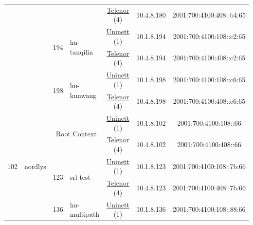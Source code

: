 \begin{small}
\begin{center}
\begin{longtable}{|c|c|c|c|c|c|c|c|}
  &  &  &  & \multicolumn{2}{|c|}{\tiny{\href{https://www.telenor.no}{Telenor} (4)}} & \tiny{10.4.8.180} & \tiny{2001:700:4100:408::b4:65} \\* \cline{3-3}\cline{4-4}\cline{5-5}\cline{6-6}\cline{7-7}\cline{8-8}
  &  & \multirow{2}{*}{\tiny{194}} & \multicolumn{1}{|l|}{\multirow{2}{*}{\tiny{hu-tanqilin}}} & \multicolumn{2}{|c|}{\tiny{\href{https://www.uninett.no}{Uninett} (1)}} & \tiny{10.1.8.194} & \tiny{2001:700:4100:108::c2:65} \\* \cline{5-5}\cline{6-6}\cline{7-7}\cline{8-8}
  &  &  &  & \multicolumn{2}{|c|}{\tiny{\href{https://www.telenor.no}{Telenor} (4)}} & \tiny{10.4.8.194} & \tiny{2001:700:4100:408::c2:65} \\* \cline{3-3}\cline{4-4}\cline{5-5}\cline{6-6}\cline{7-7}\cline{8-8}
  &  & \multirow{2}{*}{\tiny{198}} & \multicolumn{1}{|l|}{\multirow{2}{*}{\tiny{hu-kunwang}}} & \multicolumn{2}{|c|}{\tiny{\href{https://www.uninett.no}{Uninett} (1)}} & \tiny{10.1.8.198} & \tiny{2001:700:4100:108::c6:65} \\* \cline{5-5}\cline{6-6}\cline{7-7}\cline{8-8}
  &  &  &  & \multicolumn{2}{|c|}{\tiny{\href{https://www.telenor.no}{Telenor} (4)}} & \tiny{10.4.8.198} & \tiny{2001:700:4100:408::c6:65} \\ \hline
 \multirow{28}{*}{\tiny{102}} & \multicolumn{1}{|l|}{\multirow{28}{*}{\tiny{nordlys}}} & \multicolumn{2}{|c|}{\multirow{2}{*}{\tiny{Root Context}}} & \multicolumn{2}{|c|}{\tiny{\href{https://www.uninett.no}{Uninett} (1)}} & \tiny{10.1.8.102} & \tiny{2001:700:4100:108::66} \\* \cline{5-5}\cline{6-6}\cline{7-7}\cline{8-8}
  &  & \multicolumn{2}{|c|}{} & \multicolumn{2}{|c|}{\tiny{\href{https://www.telenor.no}{Telenor} (4)}} & \tiny{10.4.8.102} & \tiny{2001:700:4100:408::66} \\* \cline{3-3}\cline{4-4}\cline{5-5}\cline{6-6}\cline{7-7}\cline{8-8}
  &  & \multirow{2}{*}{\tiny{123}} & \multicolumn{1}{|l|}{\multirow{2}{*}{\tiny{srl-test}}} & \multicolumn{2}{|c|}{\tiny{\href{https://www.uninett.no}{Uninett} (1)}} & \tiny{10.1.8.123} & \tiny{2001:700:4100:108::7b:66} \\* \cline{5-5}\cline{6-6}\cline{7-7}\cline{8-8}
  &  &  &  & \multicolumn{2}{|c|}{\tiny{\href{https://www.telenor.no}{Telenor} (4)}} & \tiny{10.4.8.123} & \tiny{2001:700:4100:408::7b:66} \\* \cline{3-3}\cline{4-4}\cline{5-5}\cline{6-6}\cline{7-7}\cline{8-8}
  &  & \multirow{2}{*}{\tiny{136}} & \multicolumn{1}{|l|}{\multirow{2}{*}{\tiny{hu-multipath}}} & \multicolumn{2}{|c|}{\tiny{\href{https://www.uninett.no}{Uninett} (1)}} & \tiny{10.1.8.136} & \tiny{2001:700:4100:108::88:66} \\* \cline{5-5}\cline{6-6}\cline{7-7}\cline{8-8}

\end{longtable}
\end{center}
\end{small}
